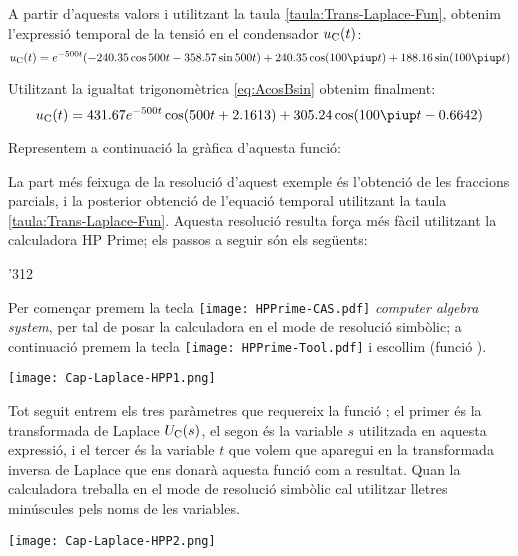 \begin{exemple}
    A partir d'aquests valors i utilitzant la taula
    \vref{taula:Trans-Laplace-Fun}, obtenim l'expressió temporal de la
    tensió en el condensador $u_\mathrm{C}(t)$:
    \[
        u\ped{C}(t) = e^{-500t} (\num{-240,35} \cos 500 t - \num{358,57} \sin 500
        t) + \num{240,35} \cos (100\piup t) + \num{188,16} \sin( 100\piup
        t)
    \]

    Utilitzant la igualtat trigonomètrica \eqref{eq:AcosBsin} obtenim finalment:
    \[
        u\ped{C}(t)= \num{431,67} e^{-500t} \cos(500 t +\num{2,1613}) + \num{305,24} \cos (100\piup t - \num{0,6642})
    \]

    Representem a continuació la gràfica d'aquesta
    funció:

    \begin{center}
      
    \end{center}

    La part més feixuga de la resolució d'aquest exemple és l'obtenció de les fraccions parcials, i la posterior obtenció de l'equació temporal utilitzant la taula \ref{taula:Trans-Laplace-Fun}. Aquesta resolució resulta força més fàcil utilitzant la calculadora \textsf{HP Prime};
    els passos a seguir són els següents:

    \begin{dingautolist}{'312}

        \item Per començar premem la tecla \texttt{[image: HPPrime-CAS.pdf]} \textit{computer algebra system}, per tal de posar la calculadora en el mode de resolució simbòlic; a continuació premem la tecla \texttt{[image: HPPrime-Tool.pdf]} i escollim  (funció ).

            \texttt{[image: Cap-Laplace-HPP1.png]}

         \item Tot seguit entrem els tres paràmetres que requereix la funció ; el primer és la transformada de Laplace  $U_\mathrm{C}(s)$, el segon és la variable $s$ utilitzada en aquesta expressió, i el tercer és la variable $t$ que volem que aparegui en la transformada inversa de Laplace que ens donarà aquesta funció com a resultat. Quan la calculadora treballa en el  mode de resolució simbòlic cal utilitzar lletres minúscules pels noms de les variables.

            \texttt{[image: Cap-Laplace-HPP2.png]}\vspace{5mm}


\end{dingautolist}
\end{exemple}
